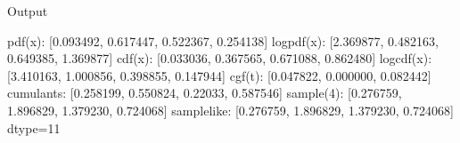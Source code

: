 \documentclass[letterpaper,10pt,english]{sphinxmanual}
\begin{document}
\begin{sphinxVerbatim}[commandchars=\\\{\}]
\end{sphinxVerbatim}

\sphinxAtStartPar
Output

\begin{sphinxVerbatim}[commandchars=\\\{\}]
pdf(x):      [0.093492, 0.617447, 0.522367, 0.254138]
logpdf(x):   [\PYGZhy{}2.369877, \PYGZhy{}0.482163, \PYGZhy{}0.649385, \PYGZhy{}1.369877]
cdf(x):      [0.033036, 0.367565, 0.671088, 0.862480]
logcdf(x):   [\PYGZhy{}3.410163, \PYGZhy{}1.000856, \PYGZhy{}0.398855, \PYGZhy{}0.147944]
cgf(t):      [\PYGZhy{}0.047822, 0.000000, 0.082442]
cumulants:   [0.258199, 0.550824, 0.22033, 0.587546]
sample(\PYGZob{}4\PYGZcb{}): [0.276759, 1.896829, 1.379230, \PYGZhy{}0.724068]
sample\PYGZus{}like: [0.276759, 1.896829, 1.379230, \PYGZhy{}0.724068] dtype=11
\end{sphinxVerbatim}
\end{document}
